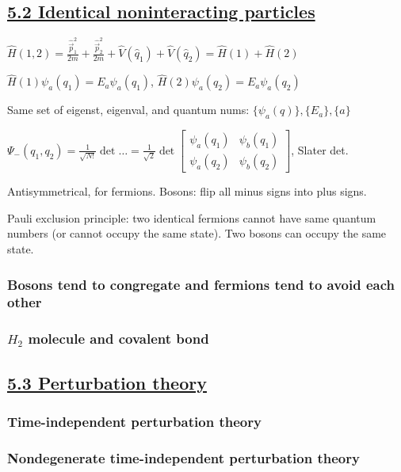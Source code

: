 \subsection{\underline{5.2 Identical noninteracting particles}}

$\widehat{H}(1, 2) = \frac{\widehat{\vec{p}}_1^2}{2m} + \frac{\widehat{\vec{p}}_2^2}{2m} + \widehat{V}(\widehat{q}_1) + \widehat{V}(\widehat{q}_2) = \widehat{H}(1) + \widehat{H}(2)$

$\widehat{H}(1) \psi_a (q_1) = E_a \psi_a(q_1)$, $\widehat{H}(2) \psi_a (q_2) = E_a \psi_a (q_2)$

Same set of eigenst, eigenval, and quantum nums: $\{\psi_a(q)\}, \{E_a\}, \{a \}$

$\Psi_{-}(q_1, q_2) = \frac{1}{\sqrt{N!}} \det \dots =\frac{1}{\sqrt{2}} \det \begin{bmatrix} \psi_a(q_1) & \psi_b(q_1) \\ \psi_a(q_2) & \psi_b(q_2) \end{bmatrix}$, Slater det.

Antisymmetrical, for fermions. Bosons: flip all minus signs into plus signs.

Pauli exclusion principle: two identical fermions cannot have same quantum numbers (or cannot occupy the same state). Two bosons can occupy the same state.

\subsubsection{Bosons tend to congregate and fermions tend to avoid each other}

\subsubsection{$H_2$ molecule and covalent bond}

\subsection{\underline{5.3 Perturbation theory}}

\subsubsection{Time-independent perturbation theory}

\subsubsection{Nondegenerate time-independent perturbation theory}

